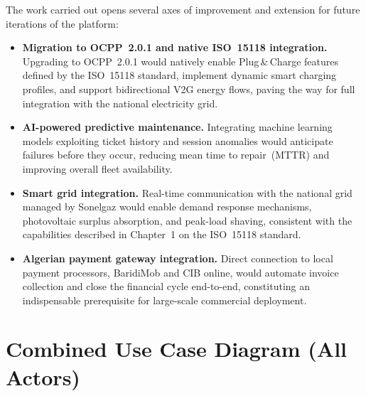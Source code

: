 \documentclass[12pt,a4paper]{report}
\begin{document}
The work carried out opens several axes of improvement and extension for future iterations
of the platform:

\begin{itemize}
  \item \textbf{Migration to OCPP~2.0.1 and native ISO~15118 integration.} Upgrading to
        OCPP~2.0.1 would natively enable Plug\,\&\,Charge features defined by the ISO~15118
        standard, implement dynamic smart charging profiles, and support bidirectional V2G
        energy flows, paving the way for full integration with the national electricity grid.

  \item \textbf{AI-powered predictive maintenance.} Integrating machine learning models
        exploiting ticket history and session anomalies would anticipate failures before
        they occur, reducing mean time to repair~(MTTR) and improving overall fleet
        availability.

  \item \textbf{Smart grid integration.} Real-time communication with the national grid
        managed by Sonelgaz would enable demand response mechanisms, photovoltaic surplus
        absorption, and peak-load shaving, consistent with the capabilities described in
        Chapter~1 on the ISO~15118 standard.

  \item \textbf{Algerian payment gateway integration.} Direct connection to local payment
        processors, BaridiMob and CIB online, would automate invoice collection and close
        the financial cycle end-to-end, constituting an indispensable prerequisite for
        large-scale commercial deployment.
\end{itemize}


\clearpage
\printbibliography[
  heading = bibintoc,          %
  title   = {References},
]


\appendix
\chapter{Combined Use Case Diagram (All Actors)}
\label{app:usecase-full}
\end{document}
